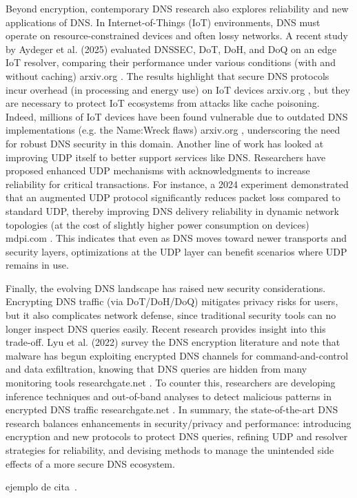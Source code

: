 Beyond encryption, contemporary DNS research also explores reliability and new
applications of DNS. In Internet-of-Things (IoT) environments, DNS must operate
on resource-constrained devices and often lossy networks. A recent study by
Aydeger et al. (2025) evaluated DNSSEC, DoT, DoH, and DoQ on an edge IoT
resolver, comparing their performance under various conditions (with and
without caching) arxiv.org . The results highlight that secure DNS protocols
incur overhead (in processing and energy use) on IoT devices arxiv.org , but
they are necessary to protect IoT ecosystems from attacks like cache poisoning.
Indeed, millions of IoT devices have been found vulnerable due to outdated DNS
implementations (e.g. the Name:Wreck flaws) arxiv.org , underscoring the need
for robust DNS security in this domain. Another line of work has looked at
improving UDP itself to better support services like DNS. Researchers have
proposed enhanced UDP mechanisms with acknowledgments to increase reliability
for critical transactions. For instance, a 2024 experiment demonstrated that an
augmented UDP protocol significantly reduces packet loss compared to standard
UDP, thereby improving DNS delivery reliability in dynamic network topologies
(at the cost of slightly higher power consumption on devices) mdpi.com . This
indicates that even as DNS moves toward newer transports and security layers,
optimizations at the UDP layer can benefit scenarios where UDP remains in use.

Finally, the evolving DNS landscape has raised new security considerations.
Encrypting DNS traffic (via DoT/DoH/DoQ) mitigates privacy risks for users, but
it also complicates network defense, since traditional security tools can no
longer inspect DNS queries easily. Recent research provides insight into this
trade-off. Lyu et al. (2022) survey the DNS encryption literature and note that
malware has begun exploiting encrypted DNS channels for command-and-control and
data exfiltration, knowing that DNS queries are hidden from many monitoring
tools researchgate.net . To counter this, researchers are developing inference
techniques and out-of-band analyses to detect malicious patterns in encrypted
DNS traffic researchgate.net . In summary, the state-of-the-art DNS research
balances enhancements in security/privacy and performance: introducing
encryption and new protocols to protect DNS queries, refining UDP and resolver
strategies for reliability, and devising methods to manage the unintended side
effects of a more secure DNS ecosystem.

ejemplo de cita~\cite{rfc9114,rfc9000,rfc8446}.
